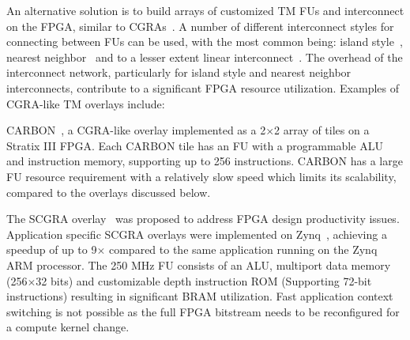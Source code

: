 \begin{comment}
\end{comment}

An alternative solution is to build arrays of customized TM FUs and interconnect on the FPGA, similar to CGRAs~\cite{mei2003adres}. 
A number of different interconnect styles for connecting between FUs can be used, with the most common being: island style~\cite{coole2010intermediate, jain2015efficient}, nearest neighbor~\cite{paul2012remorph, liu2013soft} and to a lesser extent linear interconnect~\cite{capalija2011towards, jain2016deco}.
The overhead of the interconnect network, particularly for island style and nearest neighbor interconnects, contribute to a significant FPGA resource utilization.
Examples of CGRA-like TM overlays include:



CARBON~\cite{brant2013coarse}, a CGRA-like overlay implemented as a 2$\times$2 array of tiles on a Stratix III FPGA. Each CARBON tile has an FU with a programmable ALU and instruction memory, supporting up to 256 instructions. 
CARBON has a large FU resource requirement with a relatively slow speed which limits its scalability, compared to the overlays discussed below.


The SCGRA overlay~\cite{liu2013soft} was proposed to address FPGA design productivity issues. 
Application specific SCGRA overlays were implemented on Zynq~\cite{liu2015quickdough}, achieving a speedup of up to 9$\times$ compared to the same application running on the Zynq ARM processor. 
The 250 MHz FU consists of an ALU, multiport data memory (256$\times$32 bits) and customizable depth instruction ROM (Supporting 72-bit instructions) resulting in significant BRAM utilization. 
Fast application context switching is not possible as the full FPGA bitstream needs to be reconfigured for a compute kernel change.



